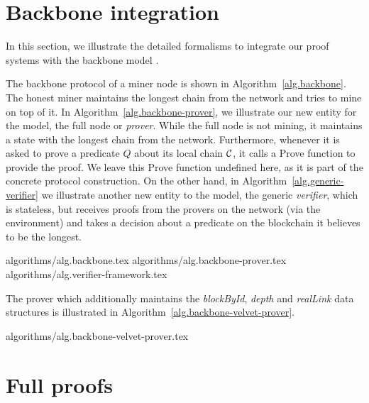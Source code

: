 \section{Backbone integration}
\label{sec.appendix-backbone}


In this section, we illustrate the detailed formalisms to integrate our proof
systems with the backbone model \cite{backbone}.

The backbone protocol of a miner node is shown in Algorithm~\ref{alg.backbone}.
The honest miner maintains the longest chain from the network and tries to mine
on top of it. In Algorithm~\ref{alg.backbone-prover}, we illustrate our new
entity for the model, the full node or \textit{prover}.  While the full node is
not mining, it maintains a state with the longest chain from the network.
Furthermore, whenever it is asked to prove a predicate $Q$ about its local
chain $\mathcal{C}$, it calls a Prove function to provide the proof.  We leave this
Prove function undefined here, as it is part of the concrete protocol
construction. On the other hand, in Algorithm~\ref{alg.generic-verifier} we
illustrate another new entity to the model, the generic \textit{verifier},
which is stateless, but receives proofs from the provers on the network (via
the environment) and takes a decision about a predicate on the blockchain it
believes to be the longest.

{algorithms/alg.backbone.tex}
{algorithms/alg.backbone-prover.tex}
{algorithms/alg.verifier-framework.tex}

The prover which additionally maintains the \textit{blockById},
\textit{depth} and \textit{realLink} data structures is illustrated in
Algorithm~\ref{alg.backbone-velvet-prover}.

{algorithms/alg.backbone-velvet-prover.tex}
\section{Full proofs}
\label{sec.proofs}





